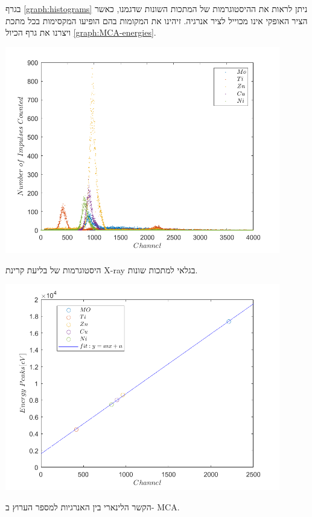 \documentclass{article}
\begin{document}
בגרף
\ref{graph:histograms}
ניתן לראות את ההיסטוגרמות של המתכות השונות שדגמנו, כאשר הציר האופקי אינו מכוייל לציר אנרגיה. זיהינו את המקומות בהם הופיעו המקסימות בכל מתכת ויצרנו את גרף הכיול
\ref{graph:MCA-energies}.

\begin{graph}[H]
    \centering
    \includegraphics[width=0.9\textwidth]{spec.png}
    \caption{
    היסטוגרמות של בליעת קרינת
    \textenglish{X-ray}
    בגלאי למתכות שונות.
    }
    \label{graph:histograms}
\end{graph}

\begin{graph}[H]
    \centering
    \includegraphics[width=0.9\textwidth]{calibration.png}
    \caption{
    הקשר הלינארי בין האנרגיות למספר הערוץ ב-
    \textenglish{MCA}.
    }
    \label{graph:MCA-energies}
\end{graph}
\end{document}
